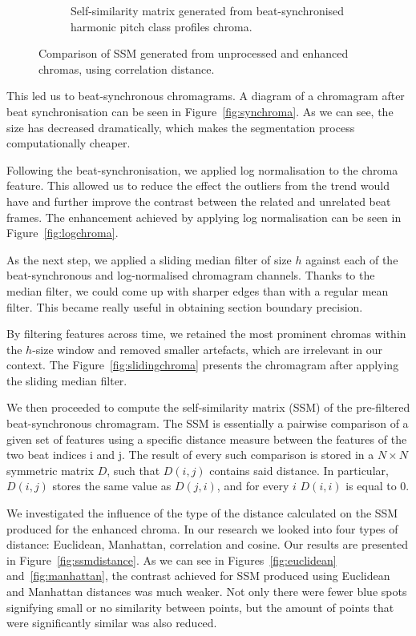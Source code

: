 \begin{figure}[b]
\begin{subfigure}[b]{0.47\textwidth}
                \caption{Self-similarity matrix generated from beat-synchronised harmonic pitch class profiles chroma.}
                \label{fig:synSSM}
        \end{subfigure}
          \caption{Comparison of SSM generated from unprocessed and enhanced chromas, using correlation distance.}
        \label{fig:ssmcomparison}
\end{figure}

This led us to beat-synchronous chromagrams. A diagram of a chromagram after beat synchronisation can be seen in Figure~\ref{fig:synchroma}. As we can see, the size has decreased dramatically, which makes the segmentation process computationally cheaper.

Following the beat-synchronisation, we applied log normalisation to the chroma feature. This allowed us to reduce the effect the outliers from the trend would have and further improve the contrast between the related and unrelated beat frames. The enhancement achieved by applying log normalisation can be seen in Figure~\ref{fig:logchroma}.

As the next step, we applied a sliding median filter of size $h$ against each of the beat-synchronous and log-normalised chromagram channels. Thanks to the median filter, we could come up with sharper edges than with a regular mean filter. This became really useful in obtaining section boundary precision.

By filtering features across time, we retained the most prominent chromas within the $h$-size window and removed smaller artefacts, which are irrelevant in our context. The Figure~\ref{fig:slidingchroma} presents the chromagram after applying the sliding median filter.

We then proceeded to compute the self-similarity matrix (SSM) of the pre-filtered beat-synchronous chromagram. The SSM is essentially a pairwise comparison of a given set of features using a specific distance measure between the features of the two beat indices i and j. The result of every such comparison is stored in a $N \times N$ symmetric matrix $D$, such that $D(i, j)$ contains said distance. In particular, $D(i, j)$ stores the same value as $D(j, i)$, and for every $i$ $D(i, i)$ is equal to 0.

We investigated the influence of the type of the distance calculated on the SSM produced for the enhanced chroma. In our research we looked into four types of distance: Euclidean, Manhattan, correlation and cosine. Our results are presented in Figure~\ref{fig:ssmdistance}. 
As we can see in Figures~\ref{fig:euclidean} and~\ref{fig:manhattan}, the contrast achieved for SSM produced using Euclidean and Manhattan distances was much weaker. Not only there were fewer blue spots signifying small or no similarity between points, but the amount of points that were significantly similar was also reduced.


